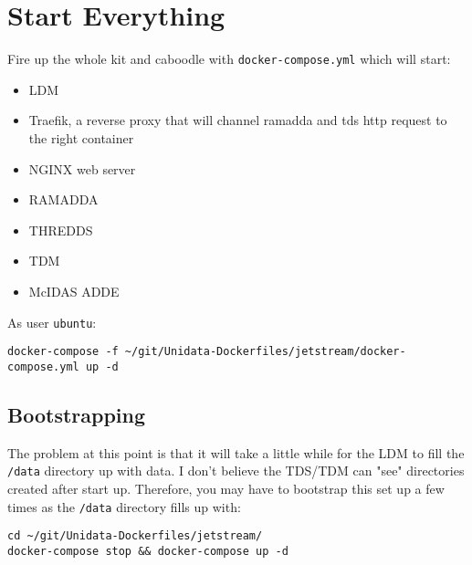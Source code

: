 \documentclass[onecolumn,9pt]{article}
\renewcommand{\href}[2]{#2\footnoteURL{\url{#1}}}
\begin{document}
\section{Start Everything}
\label{sec:orgheadline33}

Fire up the whole kit and caboodle with \texttt{docker-compose.yml} which will start:

\begin{itemize}
\item LDM
\item \href{https://traefik.io/}{Traefik}, a reverse proxy that will channel ramadda and tds http request to the right container
\item NGINX web server
\item RAMADDA
\item THREDDS
\item TDM
\item McIDAS ADDE
\end{itemize}

As user \texttt{ubuntu}:

\lstset{frame=lines,basicstyle=\footnotesize,numbers=left,numberstyle=\tiny,language=sh,label= ,caption= ,captionpos=b}
\begin{lstlisting}
docker-compose -f ~/git/Unidata-Dockerfiles/jetstream/docker-compose.yml up -d
\end{lstlisting}

\subsection{Bootstrapping}
\label{sec:orgheadline32}

The problem at this point is that it will take a little while for the LDM to fill the \texttt{/data} directory up with data. I don't believe the TDS/TDM can "see" directories created after start up. Therefore, you may have to bootstrap this set up a few times as the \texttt{/data} directory fills up with:

\lstset{frame=lines,basicstyle=\footnotesize,numbers=left,numberstyle=\tiny,language=sh,label= ,caption= ,captionpos=b}
\begin{lstlisting}
cd ~/git/Unidata-Dockerfiles/jetstream/
docker-compose stop && docker-compose up -d
\end{lstlisting}
\end{document}
